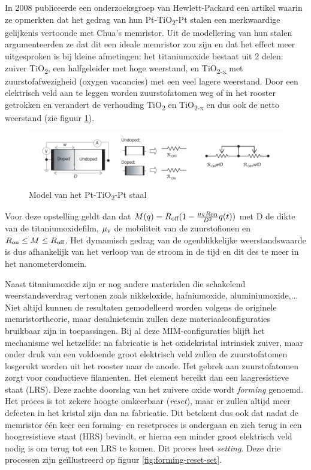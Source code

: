 In 2008 publiceerde een onderzoeksgroep van Hewlett-Packard een artikel waarin ze opmerkten dat het gedrag van hun Pt-TiO\textsubscript{2}-Pt stalen een merkwaardige gelijkenis vertoonde met Chua's memristor.\cite{Str08} Uit de modellering van hun stalen argumenteerden ze dat dit een ideale memristor zou zijn en dat het effect meer uitgesproken is bij kleine afmetingen: het titaniumoxide bestaat uit 2 delen: zuiver TiO\textsubscript{2}, een halfgeleider met hoge weerstand, en TiO\textsubscript{2-x} met zuurstofafwezigheid (oxygen vacancies) met een veel lagere weerstand. Door een elektrisch veld aan te leggen worden zuurstofatomen weg of in het rooster getrokken en verandert de verhouding TiO\textsubscript{2} en TiO\textsubscript{2-x} en dus ook de netto weerstand (zie figuur \ref{fig:HP-model}).

\begin{figure}
  \centering
  \includegraphics[scale=0.5]{../fig/hfdstk-cel-HP-model.png}
  \caption{Model van het Pt-TiO\textsubscript{2}-Pt staal\cite{Str08}}
  \label{fig:HP-model}
\end{figure}

Voor deze opstelling geldt dan dat $M(q)=R\textsubscript{off}(1-\frac{\mu\textsubscript{v}R\textsubscript{on}}{D^2}q(t))$ met D de dikte van de titaniumoxidefilm, $\mu\textsubscript{v}$ de mobiliteit van de zuurstofionen en $R\textsubscript{on} \leq M \leq R\textsubscript{off}$. Het dymamisch gedrag van de ogenblikkelijke weerstandswaarde is dus afhankelijk van het verloop van de stroom in de tijd en dit des te meer in het nanometerdomein.

Naast titaniumoxide zijn er nog andere materialen die schakelend weerstandsverdrag vertonen zoals nikkeloxide\cite{Bae04}, hafniumoxide\cite{Che11}, aluminiumoxide\cite{Kim06},... Niet altijd kunnen de resultaten gemodelleerd worden volgens de originele memristortheorie, maar desalnietemin zullen deze materiaalconfiguraties bruikbaar zijn in toepassingen.
Bij al deze MIM-configuraties blijft het mechanisme wel hetzelfde: na fabricatie is het oxidekristal intrinsiek zuiver, maar onder druk van een voldoende groot elektrisch veld zullen de zuurstofatomen losgerukt worden uit het rooster naar de anode. Het gebrek aan zuurstofatomen zorgt voor conductieve filamenten. Het element bereikt dan een laagresistieve staat (LRS).
Deze zachte doorslag van het zuivere oxide wordt \emph{forming} genoemd. Het proces is tot zekere hoogte omkeerbaar (\emph{reset}), maar er zullen altijd meer defecten in het kristal zijn dan na fabricatie. Dit betekent dus ook dat nadat de memristor één keer een forming- en resetproces is ondergaan en zich terug in een hoogresistieve staat (HRS) bevindt, er hierna een minder groot elektrisch veld nodig is om terug tot een LRS te komen. Dit proces heet \emph{setting}. Deze drie processen zijn geïllustreerd op figuur \ref{fig:forming-reset-set}.

